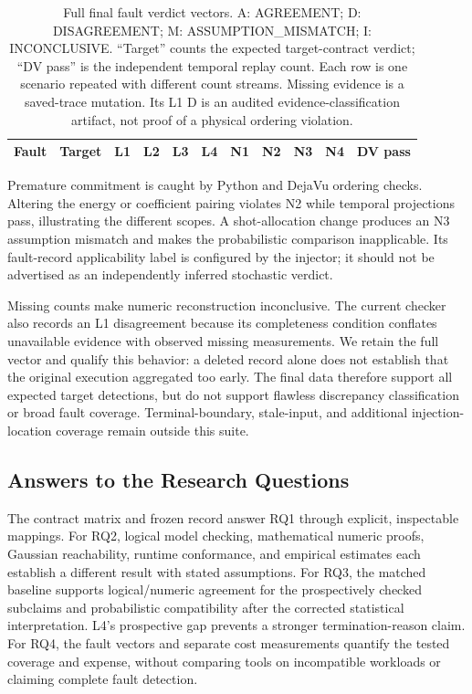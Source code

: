 \documentclass[conference]{IEEEtran}
\begin{document}
\begin{table}[!t]
\centering\footnotesize
\caption{Full final fault verdict vectors. A: AGREEMENT; D: DISAGREEMENT; M: ASSUMPTION\_MISMATCH; I: INCONCLUSIVE. ``Target'' counts the expected target-contract verdict; ``DV pass'' is the independent temporal replay count. Each row is one scenario repeated with different count streams. Missing evidence is a saved-trace mutation. Its L1 D is an audited evidence-classification artifact, not proof of a physical ordering violation.}
\label{tab:faults}
\begin{tabular}{@{}lrrrrrrrrrr@{}}\toprule
Fault & Target & L1 & L2 & L3 & L4 & N1 & N2 & N3 & N4 & DV pass \\
\midrule


\end{tabular}
\end{table}

Premature commitment is caught by Python and DejaVu ordering checks. Altering the energy or coefficient pairing violates N2 while temporal projections pass, illustrating the different scopes. A shot-allocation change produces an N3 assumption mismatch and makes the probabilistic comparison inapplicable. Its fault-record applicability label is configured by the injector; it should not be advertised as an independently inferred stochastic verdict.

Missing counts make numeric reconstruction inconclusive. The current checker also records an L1 disagreement because its completeness condition conflates unavailable evidence with observed missing measurements. We retain the full vector and qualify this behavior: a deleted record alone does not establish that the original execution aggregated too early. The final data therefore support all expected target detections, but do not support flawless discrepancy classification or broad fault coverage. Terminal-boundary, stale-input, and additional injection-location coverage remain outside this suite.

\subsection{Answers to the Research Questions}
The contract matrix and frozen record answer RQ1 through explicit, inspectable mappings. For RQ2, logical model checking, mathematical numeric proofs, Gaussian reachability, runtime conformance, and empirical estimates each establish a different result with stated assumptions. For RQ3, the matched baseline supports logical/numeric agreement for the prospectively checked subclaims and probabilistic compatibility after the corrected statistical interpretation. L4's prospective gap prevents a stronger termination-reason claim. For RQ4, the fault vectors and separate cost measurements quantify the tested coverage and expense, without comparing tools on incompatible workloads or claiming complete fault detection.
\end{document}
